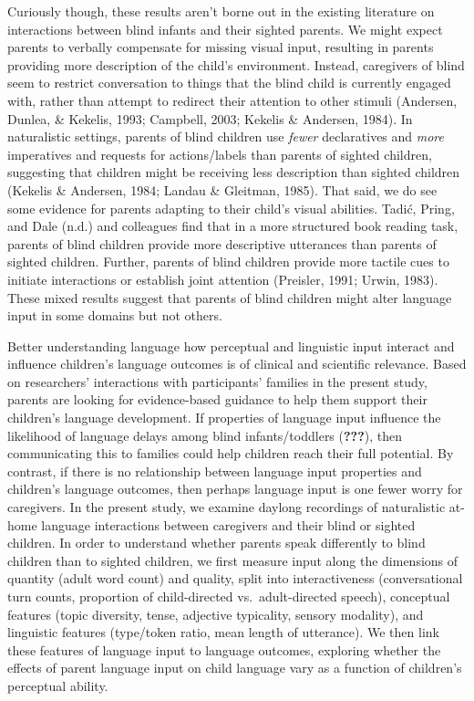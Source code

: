 \documentclass[english,man]{apa6}
\begin{document}
Curiously though, these results aren't borne out in the existing literature on interactions between blind infants and their sighted parents. We might expect parents to verbally compensate for missing visual input, resulting in parents providing more description of the child's environment. Instead, caregivers of blind seem to restrict conversation to things that the blind child is currently engaged with, rather than attempt to redirect their attention to other stimuli (Andersen, Dunlea, \& Kekelis, 1993; Campbell, 2003; Kekelis \& Andersen, 1984). In naturalistic settings, parents of blind children use \emph{fewer} declaratives and \emph{more} imperatives and requests for actions/labels than parents of sighted children, suggesting that children might be receiving less description than sighted children (Kekelis \& Andersen, 1984; Landau \& Gleitman, 1985). That said, we do see some evidence for parents adapting to their child's visual abilities. Tadić, Pring, and Dale (n.d.) and colleagues find that in a more structured book reading task, parents of blind children provide more descriptive utterances than parents of sighted children. Further, parents of blind children provide more tactile cues to initiate interactions or establish joint attention (Preisler, 1991; Urwin, 1983). These mixed results suggest that parents of blind children might alter language input in some domains but not others.

Better understanding language how perceptual and linguistic input interact and influence children's language outcomes is of clinical and scientific relevance. Based on researchers' interactions with participants' families in the present study, parents are looking for evidence-based guidance to help them support their children's language development. If properties of language input influence the likelihood of language delays among blind infants/toddlers ({\textbf{???}}), then communicating this to families could help children reach their full potential. By contrast, if there is no relationship between language input properties and children's language outcomes, then perhaps language input is one fewer worry for caregivers. In the present study, we examine daylong recordings of naturalistic at-home language interactions between caregivers and their blind or sighted children. In order to understand whether parents speak differently to blind children than to sighted children, we first measure input along the dimensions of quantity (adult word count) and quality, split into interactiveness (conversational turn counts, proportion of child-directed vs.~adult-directed speech), conceptual features (topic diversity, tense, adjective typicality, sensory modality), and linguistic features (type/token ratio, mean length of utterance). We then link these features of language input to language outcomes, exploring whether the effects of parent language input on child language vary as a function of children's perceptual ability.
\end{document}
